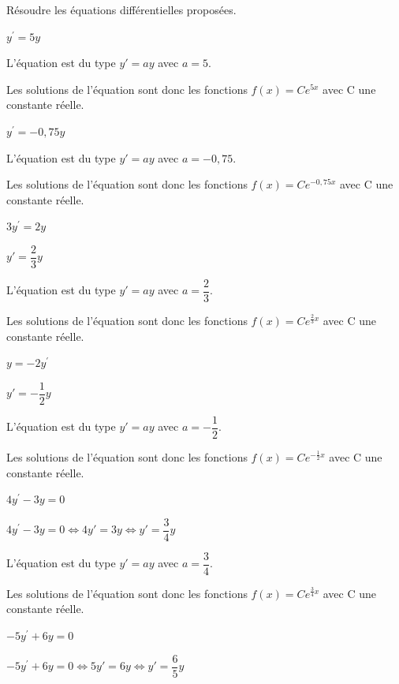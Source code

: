 \documentclass[11pt,a4paper]{article}  %
\begin{document}
\exerciceDS{}

Résoudre les équations différentielles proposées.

	\begin{enumMet}
	\item $y^{\prime}=5 y$
	\begin{corrBox}
		L'équation est du type $y'=ay$ avec $a=5$. 
		
		Les solutions de l'équation sont donc les fonctions $f(x)=Ce^{5x}$ avec C une constante réelle.		
	\end{corrBox}
	\item $y^{\prime}=-0,75 y$
	\begin{corrBox}
		L'équation est du type $y'=ay$ avec $a=-0,75$. 
		
		Les solutions de l'équation sont donc les fonctions $f(x)=Ce^{-0,75x}$ avec C une constante réelle.		
	\end{corrBox}
	\item $3 y^{\prime}=2 y$
	\begin{corrBox}
		$y'=\dfrac{2}{3}y$
		
		L'équation est du type $y'=ay$ avec $a=\dfrac{2}{3}$. 
		
		Les solutions de l'équation sont donc les fonctions $f(x)=Ce^{\frac{2}{3}x}$ avec C une constante réelle.		
	\end{corrBox}
	\item $y=-2 y^{\prime}$
	\begin{corrBox}
		$y'=-\dfrac{1}{2}y$
		
		L'équation est du type $y'=ay$ avec $a=-\dfrac{1}{2}$. 
		
		Les solutions de l'équation sont donc les fonctions $f(x)=Ce^{-\frac{1}{2}x}$ avec C une constante réelle.		
	\end{corrBox}
	\item $4 y^{\prime}-3 y=0$
	\begin{corrBox}
		$4 y^{\prime}-3 y=0 \iff 4y'=3y \iff y'=\dfrac{3}{4}y$
		
		L'équation est du type $y'=ay$ avec $a=\dfrac{3}{4}$. 
		
		Les solutions de l'équation sont donc les fonctions $f(x)=Ce^{\frac{3}{4}x}$ avec C une constante réelle.		
	\end{corrBox}
	\item $-5 y^{\prime}+6 y=0$
	\begin{corrBox}
		$-5 y^{\prime}+6 y=0 \iff 5y'=6y \iff y'=\dfrac{6}{5}y$
		

\end{corrBox}
\end{enumMet}
\end{document}
